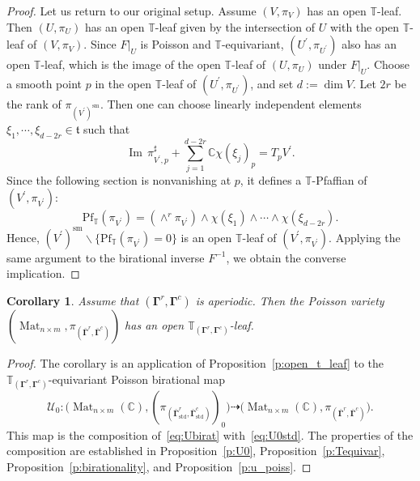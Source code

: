 \documentclass[11pt]{article}
\newcommand{\bbg}{\bar{\mathbf{\Gamma}}}
\newcommand{\bg}{\mathbf{\Gamma}}
\newcommand{\std}{\mathrm{std}}
\DeclareMathOperator{\Mat}{Mat}
\DeclareMathOperator{\Imm}{Im}
\DeclareMathOperator{\sm}{sm}
\newtheorem{corollary}[theorem]{Corollary}
\theoremstyle{definition}\newtheorem{definition}[theorem]{Definition}
\theoremstyle{definition}\newtheorem{remark}[theorem]{Remark}
\theoremstyle{remark}
\numberwithin{equation}{section}
\begin{document}
\begin{proof}
    Let us return to our original setup. Assume $(V,\pi_V)$ has an open $\mathbb{T}$-leaf. Then $(U,\pi_U)$ has an open $\mathbb{T}$-leaf given by the intersection of $U$ with the open $\mathbb{T}$-leaf of $(V,\pi_V)$. Since $F|_U$ is Poisson and $\mathbb{T}$-equivariant, $(U^\prime,\pi_{U^\prime})$ also has an open $\mathbb{T}$-leaf, which is the image of the open $\mathbb{T}$-leaf of $(U,\pi_U)$ under $F|_U$. Choose a smooth point $p$ in the open $\mathbb{T}$-leaf of $(U^\prime,\pi_{U^\prime})$, and set $d:=\dim V$. Let $2r$ be the rank of $\pi_{(V^\prime)^{\sm}}$. Then one can choose linearly independent elements $\xi_1,\cdots, \xi_{d-2r}\in \mathfrak{t}$ such that
    \begin{equation*}
        \Imm\, \pi^\sharp_{V^\prime,p} +\sum_{j=1}^{d-2r}\mathbb{C}\chi(\xi_j)_{p} =  T_p V^\prime.
    \end{equation*}
    Since the following section is nonvanishing at $p$, it defines a $\mathbb{T}$-Pfaffian of $(V^\prime,\pi_{V^\prime})$:
    \[
        \mathrm{Pf}_\mathbb{T}(\pi_{V^\prime})=(\wedge^{r} \pi_{V^\prime}) \wedge \chi({\xi_1}) \wedge \cdots \wedge \chi(\xi_{d-2r}).
    \]
    Hence, $(V^\prime)^{\sm} \backslash \{\mathrm{Pf}_\mathbb{T}(\pi_{V^\prime}) = 0\}$ is an open $\mathbb{T}$-leaf of $(V^\prime,\pi_{V^\prime})$. Applying the same argument to the birational
    inverse $F^{-1}$, we obtain the converse implication.
\end{proof}
\begin{corollary}
    Assume that $(\bg^r,\bg^c)$ is aperiodic. Then the Poisson variety $(\Mat_{n \times m},\pi_{(\bbg^r,\bbg^c)})$ has an open $\mathbb{T}_{(\bg^r,\bg^c)}$-leaf.
\end{corollary}
\begin{proof}
    The corollary is an application of Proposition~\ref{p:open_t_leaf} to the $\mathbb{T}_{(\bg^r,\bg^c)}$-equivariant Poisson birational map
    \begin{equation*}
        \mathcal{U}_0 : \big( \Mat_{n\times m}(\mathbb{C}), (\pi_{(\bbg^r_{\std},\bbg^c_{\std})})_0 \big) \dashrightarrow \big( \Mat_{n\times m}(\mathbb{C}), \pi_{(\bbg^r,\bbg^c)} \big).
    \end{equation*}
    This map is the composition of~\eqref{eq:Ubirat} with~\eqref{eq:U0std}. 
    The properties of the composition are established in Proposition~\ref{p:U0}, Proposition~\ref{p:Tequivar}, Proposition~\ref{p:birationality}, and Proposition~\ref{p:u_poiss}.
\end{proof}
\end{document}
